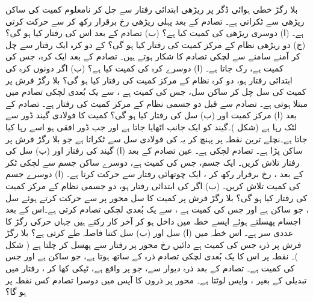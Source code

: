 بلا رگڑ   خطی ہوائی ڈگر  پر  ریڑھی   ابتدائی رفتار سے چل کر نامعلوم  کمیت  کی  ساکن ریڑھی  سے ٹکراتی ہے۔ تصادم کے بعد پہلی ریڑھی رخ برقرار رکھ کر  سے حرکت کرتی ہے۔ (ا) دوسری ریڑھی کی کمیت کیا ہے؟ (ب) تصادم کے بعد اس کی رفتار کیا ہو گی؟ (ج)  دو ریڑھی نظام کے مرکز کمیت کی رفتار کیا ہو گی؟
 کے دو کرہ  ایک رفتار سے چل کر آمنے سامنے سے لچکی تصادم کا شکار ہوتے ہیں۔ تصادم کے بعد ایک کرہ، جس کی کمیت  ہے، رک جاتا ہے۔ (ا) دوسرے کرہ کی کمیت کیا ہے؟ (ب)  اگر دونوں کرہ  کی ابتدائی رفتار  ہو، دو کرہ  نظام کے مرکز کمیت کی رفتار کیا ہو گی؟
بلا رگڑ فرش پر   کمیت کی سل چل کر   ساکن سل، جس کی کمیت  ہے ، سے  یک بُعدی لچکی تصادم میں مبتلا ہوتی ہے۔ تصادم سے قبل دو جسمی نظام کے مرکز کمیت کی رفتار 
 ہے۔ تصادم کے بعد  (ا) مرکز کمیت اور (ب) سل  کی رفتار کیا ہو گی؟
 کمیت  کا فولادی گیند   ڈور  سے لٹک رہا ہے (شکل )۔گیند کو ایک جانب  اٹھایا جاتا ہے اور جب ڈور افقی ہو اسے رہا کیا جاتا ہے۔نچلے ترین نقطہ پر پہنچ کر یہ  کی فولادی سل سے ٹکراتا ہے جو بلا رگڑ فرش پر ساکن پڑا ہے۔ تصادم لچکی ہے۔ عین تصادم کے بعد (ا) گیند کی رفتار اور (ب)  سل کی رفتار تلاش کریں۔
ایک جسم،  جس کی کمیت  ہے،  دوسرے ساکن جسم سے لچکی ٹکر کے بعد ،  رخ برقرار رکھ کر ، ایک چوتھائی  رفتار سے  حرکت کرتا ہے۔ (ا) دوسرے جسم کی کمیت تلاش کریں۔ (ب)  اگر   کی ابتدائی رفتار  ہو، دو جسمی نظام کے مرکز کمیت کی رفتار کیا ہو گی؟
بلا رگڑ فرش پر  کمیت کا سل  محور  پر  سے حرکت کرتے ہوئے  سل  ، جو ساکن ہے اور جس کی کمیت  ہے ، سے یک بُعدی لچکی تصادم کرتی ہے۔اس کے بعد اجسام پھسلتے ہوئے  ایسے خطہ میں داخل ہو کر آخر کار رکتے ہیں جہاں  حرکی رگڑ کا  عددی سر   ہے۔ اس خطہ میں (ا)  سل  اور (ب)  سل کتنا فاصلہ طے کرتی ہے؟
بلا رگڑ فرش پر  ذرہ  جس کی کمیت  ہے  دائیں رخ محور    پر    رفتار سے پھسل  کر چلتا ہے  ( شکل  )۔  نقطہ  پر اس کا یک بُعدی لچکی تصادم ذرہ  کے ساتھ ہوتا ہے، جو ساکن ہے اور جس کی کمیت  ہے۔ تصادم کے بعد ذرہ   دیوار سے،  جو پر واقع ہے،   ٹپکی کھا کر  ، رفتار  میں تبدیلی کے بغیر ، واپس لوٹتا ہے۔ محور  پر ذروں کا  آپس میں دوسرا تصادم کس نقطہ پر ہو گا؟
